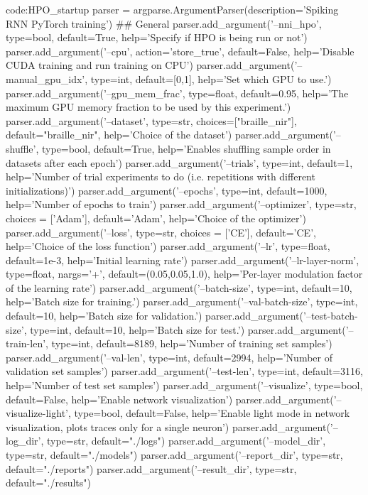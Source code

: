 \begin{mycodebox}{code:HPO_startup}
    parser = argparse.ArgumentParser(description='Spiking RNN PyTorch training')
    ## General
    parser.add_argument('--nni_hpo', type=bool, default=True, help='Specify if HPO is being run or not')
    parser.add_argument('--cpu', action='store_true', default=False, help='Disable CUDA training and run training on CPU')
    parser.add_argument('--manual_gpu_idx', type=int, default=[0,1], help='Set which GPU to use.')
    parser.add_argument('--gpu_mem_frac', type=float, default=0.95, help='The maximum GPU memory fraction to be used by this experiment.')
    parser.add_argument('--dataset', type=str, choices=["braille_nir"], default="braille_nir", help='Choice of the dataset')
    parser.add_argument('--shuffle', type=bool, default=True, help='Enables shuffling sample order in datasets after each epoch')
    parser.add_argument('--trials', type=int, default=1, help='Number of trial experiments to do (i.e. repetitions with different initializations)')
    parser.add_argument('--epochs', type=int, default=1000, help='Number of epochs to train')
    parser.add_argument('--optimizer', type=str, choices = ['Adam'], default='Adam', help='Choice of the optimizer')
    parser.add_argument('--loss', type=str, choices = ['CE'], default='CE', help='Choice of the loss function')
    parser.add_argument('--lr', type=float, default=1e-3, help='Initial learning rate')
    parser.add_argument('--lr-layer-norm', type=float, nargs='+', default=(0.05,0.05,1.0), help='Per-layer modulation factor of the learning rate')
    parser.add_argument('--batch-size', type=int, default=10, help='Batch size for training.')
    parser.add_argument('--val-batch-size', type=int, default=10, help='Batch size for validation.')
    parser.add_argument('--test-batch-size', type=int, default=10, help='Batch size for test.')
    parser.add_argument('--train-len', type=int, default=8189, help='Number of training set samples')
    parser.add_argument('--val-len', type=int, default=2994, help='Number of validation set samples')
    parser.add_argument('--test-len', type=int, default=3116, help='Number of test set samples')
    parser.add_argument('--visualize', type=bool, default=False, help='Enable network visualization')
    parser.add_argument('--visualize-light', type=bool, default=False, help='Enable light mode in network visualization, plots traces only for a single neuron')
    parser.add_argument('--log_dir', type=str, default="./logs")
    parser.add_argument('--model_dir', type=str, default="./models")
    parser.add_argument('--report_dir', type=str, default="./reports")
    parser.add_argument('--result_dir', type=str, default="./results")

\end{mycodebox}
